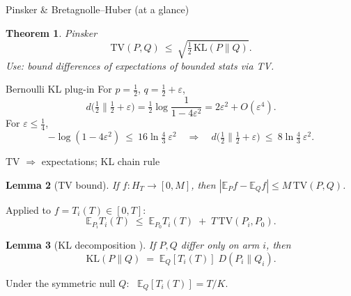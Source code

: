 \documentclass{beamer}
\newtheorem{thm}{Theorem}
\newtheorem{lem}[thm]{Lemma}
\newcommand{\E}{\mathbb{E}}
\newcommand{\KL}{\mathrm{KL}}
\begin{document}
\begin{frame}{Pinsker \& Bretagnolle--Huber (at a glance)}
  \small
  \begin{thm}{Pinsker \cite{CT06}}
    \[
      \mathrm{TV}(P,Q)\ \le\ \sqrt{\tfrac12\,\KL(P\|Q)}.
    \]
    \emph{Use:} bound differences of expectations of bounded stats via TV.
  \end{thm}

  \begin{block}{Bernoulli KL plug-in}
    For $p=\tfrac12$, $q=\tfrac12+\varepsilon$,
    \[
      d\Big(\tfrac12\Big\| \tfrac12+\varepsilon\Big)
      = \tfrac12\log\frac{1}{1-4\varepsilon^2}
      = 2\varepsilon^2 + O(\varepsilon^4).
    \]
    For $\varepsilon\le \tfrac14$,
    \[
      -\log(1-4\varepsilon^2)\ \le\ 16\ln\tfrac{4}{3}\ \varepsilon^2
      \quad\Rightarrow\quad
      d\Big(\tfrac12\Big\| \tfrac12+\varepsilon\Big)\ \le\ 8\ln\tfrac{4}{3}\ \varepsilon^2.
    \]
  \end{block}
\end{frame}





\begin{frame}{TV $\Rightarrow$ expectations; KL chain rule}
  \begin{lem}[TV bound]
    If $f:H_T \to[0,M]$, then \quad $|\E_P f-\E_Q f|\le M\,\mathrm{TV}(P,Q)$.
  \end{lem}

  \smallskip
  Applied to $f=T_i(T)\in[0,T]$:
  \[
    \E_{P_i}T_i(T) \;\le\; \E_{P_0}T_i(T) \;+\; T\,\mathrm{TV}(P_i,P_0).
  \]

  \smallskip
  \begin{lem}[KL decomposition \cite{LS20}]
    If $P,Q$ differ only on arm $i$, then \quad
    \[
      \KL(P\|Q)\;=\;\E_Q[T_i(T)]\;D(P_i\|Q_i).
    \]
  \end{lem}

  \smallskip
  Under the symmetric null $Q$: \ $\E_Q[T_i(T)]=T/K$.
\end{frame}
\end{document}

